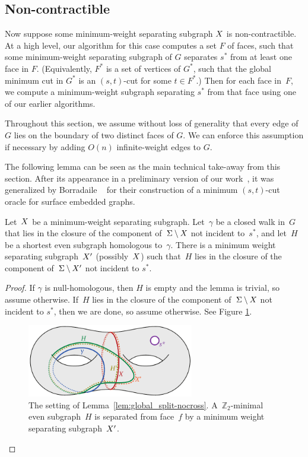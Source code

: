 \documentclass[letterpaper,review]{siamart190516}
\def\Z{\mathbb{Z}}
\begin{document}
{%

\subsection{Non-contractible}
\label{sec:global_non-contractible}

Now suppose some minimum-weight separating subgraph $X$ is non-contractible.  At a high level,
our algorithm for this case computes a set $F$ of faces, such that some minimum-weight separating
subgraph of $G$ separates $s^*$ from at least one face in $F$.  (Equivalently, $F^*$ is a set of
vertices of $G^*$, such that the global minimum cut in $G^*$ is an $(s,t)$-cut for some $t\in
F^*$.)  Then for each face in~$F$, we compute a minimum-weight subgraph separating $s^*$ from that
face using one of our earlier algorithms.

Throughout this section, we assume without loss of generality that every edge of $G$ lies on the boundary of two distinct faces of $G$.  We can enforce this assumption if necessary by adding $O(n)$ infinite-weight edges to $G$.

The following lemma can be seen as the main technical take-away from this section.
After its appearance in a preliminary version of our work~\cite{efn-gmcse-12}, it was
generalized by Borradaile \etal~\cite{benw-amcnt-16} for their construction of a minimum $(s,t)$-cut
oracle for surface embedded graphs.

\begin{lemma}
\label{lem:global_split-nocross}
Let~$X$ be a minimum-weight separating subgraph.
Let~$\gamma$ be a closed walk in~$G$ that lies in the closure of the component of~$\Sigma \setminus
X$ not incident to~$s^*$, and let~$H$
be a shortest even subgraph homologous to~$\gamma$.
There is a minimum weight separating subgraph~$X'$ (possibly~$X$) such
that~$H$ lies in the closure of the component of~$\Sigma \setminus X'$ not incident to $s^*$. 
\end{lemma}

\begin{proof}
If $\gamma$ is null-homologous, then $H$ is empty and the lemma is trivial, so assume otherwise.
If~$H$ lies in the closure of the component of~$\Sigma \setminus X$ not incident to $s^*$, then we are done, so assume otherwise.  See Figure \ref{fig:global_nonsep-vs-shortsep}. 

\begin{figure}[ht]
\centering
\includegraphics[height=1.25in]{Fig/nonsep-vs-shortsep-2}
\caption{The setting of Lemma~\ref{lem:global_split-nocross}. A~$\Z_2$-minimal even subgraph~$H$ is separated from face~$f$ by a minimum weight separating subgraph~$X'$.}
\label{fig:global_nonsep-vs-shortsep}
\end{figure}


\end{proof}}
\end{document}
